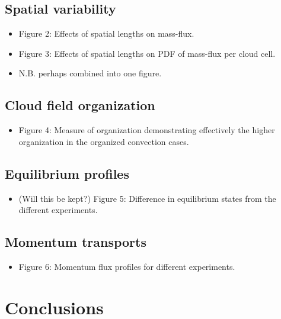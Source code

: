 \documentclass[11pt,a4paper]{article}
\begin{document}
\subsection{Spatial variability}
\begin{itemize}
    \item Figure 2: Effects of spatial lengths on mass-flux.
    \item Figure 3: Effects of spatial lengths on PDF of mass-flux per cloud cell.
    \item N.B. perhaps combined into one figure.
\end{itemize}

\subsection{Cloud field organization}
\begin{itemize}
    \item Figure 4: Measure of organization demonstrating effectively the higher organization in the organized convection cases.
\end{itemize}

\subsection{Equilibrium profiles}
\begin{itemize}
    \item (Will this be kept?) Figure 5: Difference in equilibrium states from the different experiments. 
\end{itemize}

\subsection{Momentum transports}
\begin{itemize}
    \item Figure 6: Momentum flux profiles for different experiments. 
\end{itemize}
\section{Conclusions}

\newpage
\printbibliography[title={References}]
\end{document}
